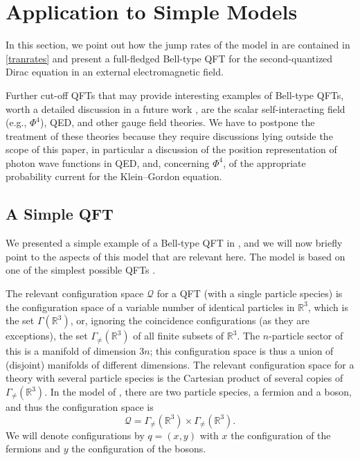 \documentclass[12pt]{article}
\newcommand{\RRR}{\mathbb{R}} %
\newcommand{\1}{\mathbf{1}} %
\newcommand{\conf}{\mathcal{Q}} %
\newcommand{\Gommo}{\Gamma_{\!\neq}} %
\begin{document}
\section{Application to Simple Models}
\label{sec:example}

In this section, we point out how the jump rates of the model in
\cite{crea1} are contained in \eqref{tranrates} and present a
full-fledged Bell-type QFT for the second-quantized Dirac equation in
an external electromagnetic field.

Further cut-off QFTs that may provide interesting examples of
Bell-type QFTs, worth a detailed discussion in a future work
\cite{crea4}, are the scalar self-interacting field (e.g., $\Phi^4$),
QED, and other gauge field theories. We have to postpone the treatment
of these theories because they require discussions lying outside the
scope of this paper, in particular a discussion of the position
representation of photon wave functions in QED, and, concerning
$\Phi^4$, of the appropriate probability current for the Klein--Gordon
equation.

\subsection{A Simple QFT}\label{sec:crea1}

We presented a simple example of a Bell-type QFT in \cite{crea1},
and we will now briefly point to the aspects of this model that are
relevant here. The model is based on one of the simplest possible QFTs
\cite[p.~339]{Schweber}.

The relevant configuration space $\conf$ for a QFT (with a single
particle species) is the configuration space of a variable number of
identical particles in $\RRR^3$, which is the set $\Gamma(\RRR^3)$,
or, ignoring the coincidence configurations (as they are exceptions),
the set $\Gommo (\RRR^3)$ of all finite subsets of
$\RRR^3$. The $n$-particle sector of this is a manifold of dimension
$3n$; this configuration space is thus a union of (disjoint) manifolds
of different dimensions. The relevant configuration space for a theory
with several particle species is the Cartesian product of several
copies of $\Gommo (\RRR^3)$.  In the model of
\cite{crea1}, there are two particle species, a fermion and a boson,
and thus the configuration space is
\begin{equation}\label{conffermionboson}
   \conf = \Gommo (\RRR^3) \times \Gommo (\RRR^3).
\end{equation}
We will denote configurations by $q=(x,y)$ with $x$ the configuration
of the fermions and $y$ the configuration of the bosons.
\end{document}
